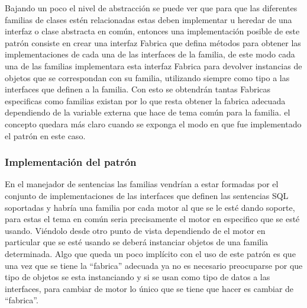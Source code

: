 Bajando un poco el nivel de abstracción se puede ver que para que las diferentes familias de clases estén relacionadas estas deben implementar u heredar de una interfaz o clase abstracta en común, entonces una implementación posible de este patrón consiste en crear una interfaz Fabrica que defina métodos para obtener las implementaciones de cada una de las interfaces de la familia, de este modo cada una de las familias implementara esta interfaz Fabrica para devolver instancias de objetos que se correspondan con su familia, utilizando siempre como tipo a las interfaces que definen a la familia. Con esto se obtendrán tantas Fabricas especificas como familias existan por lo que resta obtener la fabrica adecuada dependiendo de la variable externa que hace de tema común para la familia. el concepto quedara más claro cuando se exponga el modo en que fue implementado el patrón en este caso.
%
\subsubsection{Implementación del patrón}
En el manejador de sentencias las familias vendrían a estar formadas por el conjunto de implementaciones de las interfaces que definen las sentencias SQL soportadas y habría una familia por cada motor al que se le esté dando soporte, para estas el tema en común seria precisamente el motor en especifico que se esté usando. Viéndolo desde otro punto de vista dependiendo de el motor en particular que se esté usando se deberá instanciar objetos de una familia determinada. Algo que queda un poco implícito con el uso de este patrón es que una vez que se tiene la ``fabrica'' adecuada ya no es necesario preocuparse por que tipo de objetos se esta instanciando y si se usan como tipo de datos a las interfaces, para cambiar de motor lo único que se tiene que hacer es cambiar de ``fabrica''.

